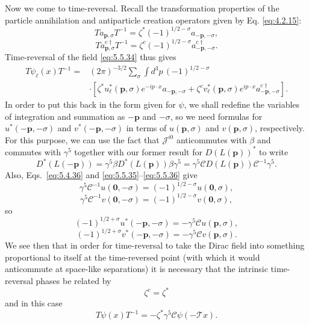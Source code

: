 Now we come to time-reversal. Recall the transformation properties of the
particle annihilation and antiparticle creation operators given by Eq.
\eqref{eq:4.2.15}:
\begin{equation}
T a_{\mathbf p,\sigma}T^{-1}
=\zeta^*(-1)^{1/2-\sigma}a_{-\mathbf p,-\sigma},
\tag{5.5.49}\label{eq:5.5.49}
\end{equation}
\begin{equation}
T a^{c\dagger}_{\mathbf p,\sigma}T^{-1}
=\zeta^c(-1)^{1/2-\sigma}a^{c\dagger}_{-\mathbf p,-\sigma}.
\tag{5.5.50}\label{eq:5.5.50}
\end{equation}
Time-reversal of the field \eqref{eq:5.5.34} thus gives
\begin{align*}
T\psi_\ell(x)T^{-1}={}&(2\pi)^{-3/2}\sum_\sigma\int d^3p\,
(-1)^{1/2-\sigma}\\
&\cdot[\zeta^*u_\ell^*(\mathbf p,\sigma)e^{-ip\cdot x}a_{-\mathbf p,-\sigma}
+\zeta^c v_\ell^*(\mathbf p,\sigma)e^{ip\cdot x}
a^{c\dagger}_{-\mathbf p,-\sigma}].
\end{align*}
In order to put this back in the form given for $\psi$, we shall redefine the
variables of integration and summation as $-\mathbf p$ and $-\sigma$, so we
need formulas for $u^*(-\mathbf p,-\sigma)$ and
$v^*(-\mathbf p,-\sigma)$ in terms of $u(\mathbf p,\sigma)$ and
$v(\mathbf p,\sigma)$, respectively. For this purpose, we can use the fact
that $\mathcal{J}^{i0}$ anticommutes with $\beta$ and commutes with $\gamma^5$
together with our former result for $D(L(\mathbf p))^*$ to write
\[
D^*(L(-\mathbf p))=\gamma^5\beta D^*(L(\mathbf p))\beta\gamma^5
=\gamma^5\mathcal{C}D(L(\mathbf p))\mathcal{C}^{-1}\gamma^5.
\]
Also, Eqs.~\eqref{eq:5.4.36} and \eqref{eq:5.5.35}--\eqref{eq:5.5.36} give
\[
\gamma^5\mathcal{C}^{-1}u(\mathbf0,-\sigma)
=(-1)^{1/2-\sigma}u(\mathbf0,\sigma),
\]
\[
\gamma^5\mathcal{C}^{-1}v(\mathbf0,-\sigma)
=(-1)^{1/2-\sigma}v(\mathbf0,\sigma),
\]
so
\begin{equation}
(-1)^{1/2+\sigma}u^*(-\mathbf p,-\sigma)
=-\gamma^5\mathcal{C}u(\mathbf p,\sigma),
\tag{5.5.51}\label{eq:5.5.51}
\end{equation}
\begin{equation}
(-1)^{1/2+\sigma}v^*(-\mathbf p,-\sigma)
=-\gamma^5\mathcal{C}v(\mathbf p,\sigma).
\tag{5.5.52}\label{eq:5.5.52}
\end{equation}
We see then that in order for time-reversal to take the Dirac field into
something proportional to itself at the time-reversed point (with which it
would anticommute at space-like separations) it is necessary that the intrinsic
time-reversal phases be related by
\begin{equation}
\zeta^c=\zeta^*
\tag{5.5.53}\label{eq:5.5.53}
\end{equation}
and in this case
\begin{equation}
T\psi(x)T^{-1}=-\zeta^*\gamma^5\mathcal{C}\psi(-\mathcal T x).
\tag{5.5.54}\label{eq:5.5.54}
\end{equation}

